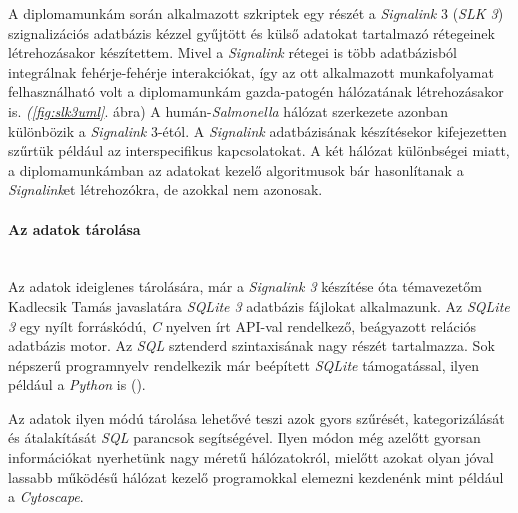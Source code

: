 \documentclass[a4paper,12pt]{article}
\begin{document}
			A diplomamunkám során alkalmazott szkriptek egy részét a \textit{Signalink} 3 (\textit{SLK 3}) szignalizációs adatbázis kézzel gyűjtött és külső adatokat tartalmazó rétegeinek létrehozásakor készítettem.  Mivel a \textit{Signalink} rétegei is több adatbázisból integrálnak fehérje-fehérje interakciókat, így az ott alkalmazott munkafolyamat felhasználható volt a diplomamunkám gazda-patogén hálózatának létrehozásakor is. \textit{(\ref{fig:slk3uml}}. ábra) A humán-\textit{Salmonella} hálózat szerkezete azonban különbözik a \textit{Signalink} 3-étól. A \textit{Signalink} adatbázisának készítésekor kifejezetten szűrtük például az interspecifikus kapcsolatokat. A két hálózat különbségei miatt, a diplomamunkámban az adatokat kezelő algoritmusok bár hasonlítanak a \textit{Signalink}et létrehozókra, de azokkal nem azonosak.
			
			\paragraph{Az adatok tárolása} \mbox{}\\
			Az adatok ideiglenes tárolására, már a \textit{Signalink 3} készítése óta témavezetőm Kadlecsik Tamás javaslatára \textit{SQLite 3} adatbázis fájlokat alkalmazunk. Az \textit{SQLite 3} egy nyílt forráskódú, \textit{C} nyelven írt API-val rendelkező, beágyazott relációs adatbázis motor. Az \textit{SQL} sztenderd szintaxisának nagy részét tartalmazza. Sok népszerű programnyelv rendelkezik már beépített \textit{SQLite} támogatással, ilyen például a \textit{Python} is (\cite{sqlite3}). 			
			
				
			Az adatok ilyen módú tárolása lehetővé teszi azok gyors szűrését, kategorizálását és átalakítását \textit{SQL} parancsok segítségével. Ilyen módon még azelőtt gyorsan információkat nyerhetünk nagy méretű hálózatokról, mielőtt azokat olyan jóval lassabb működésű hálózat kezelő programokkal elemezni kezdenénk mint például a \textit{Cytoscape}.
\end{document}
